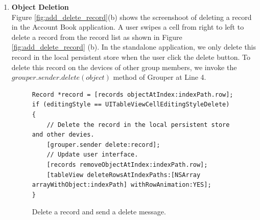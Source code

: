 \documentclass[a4paper,11pt]{report}
\begin{document}
\begin{enumerate}
The standalone application has the code from Line 2 to Line 8 in Figure \ref{fig:create_record}.
To share this record with other group members, we invoke the $grouper.sender.update()$ method of Grouper at Line 11 after saving the record in the local persistent store.

\begin{figure}
\begin{lstlisting}[frame=none language=Objective-C] 
// Save record to app local persistent store.
Record *record = [dao.recordDao saveWithMoney:money
                                       remark:_remarkTextView.text
                                         time:_selectedTime
                               classification:_selectedClassification
                                      account:_selectedAccount
                                         shop:_selectedShop
                                        photo:photo];

// Invoke update method in sender to send an update message.
[grouper.sender update:record];
\end{lstlisting}
\caption{Create a new record and send an update message.}
\label{fig:create_record}
\end{figure}

The method $grouper.sender.updated()$ divides a record into several shares and uploads them to multiple untrusted servers.
This method is also suitable for updating a record.
We can not ensure that other grouper members can synchronize this object successfully, because it has only been uploaded to multiple untrusted server
\\

\item \textbf{Object Deletion} \\

Figure \ref{fig:add_delete_record}(b) shows the screenshoot of deleting a record in the Account Book application. 
A user swipes a cell from right to left to delete a record from the record list as shown in Figure \ref{fig:add_delete_record} (b).
In the standalone application, we only delete this record in the local persistent store when the user click the delete button.
To delete this record on the devices of other group members, we invoke the $grouper.sender.delete(object)$ method of Grouper at Line 4.

\begin{figure}
\begin{lstlisting}[frame=none language=Objective-C] 
Record *record = [records objectAtIndex:indexPath.row];
if (editingStyle == UITableViewCellEditingStyleDelete) {
    // Delete the record in the local persistent store and other devies.
    [grouper.sender delete:record];
    // Update user interface.
    [records removeObjectAtIndex:indexPath.row];
    [tableView deleteRowsAtIndexPaths:[NSArray arrayWithObject:indexPath] withRowAnimation:YES];
}	
\end{lstlisting}
\caption{Delete a record and send a delete message.}
\label{fig:delete_record}
\end{figure}


\end{enumerate}
\end{document}
